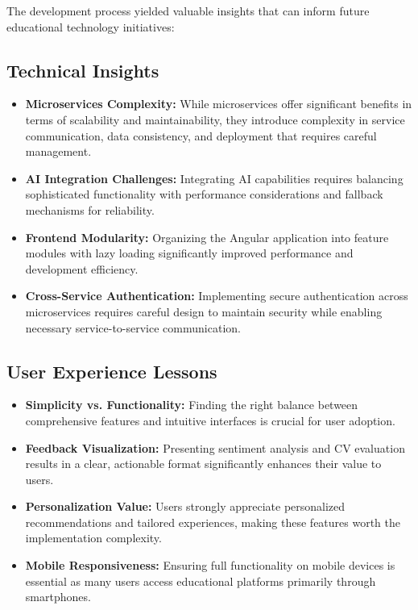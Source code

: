 \documentclass[12pt,a4paper]{report}
\begin{document}
The development process yielded valuable insights that can inform future educational technology initiatives:

\subsection{Technical Insights}

\begin{itemize}
    \item \textbf{Microservices Complexity:} While microservices offer significant benefits in terms of scalability and maintainability, they introduce complexity in service communication, data consistency, and deployment that requires careful management.

    \item \textbf{AI Integration Challenges:} Integrating AI capabilities requires balancing sophisticated functionality with performance considerations and fallback mechanisms for reliability.

    \item \textbf{Frontend Modularity:} Organizing the Angular application into feature modules with lazy loading significantly improved performance and development efficiency.

    \item \textbf{Cross-Service Authentication:} Implementing secure authentication across microservices requires careful design to maintain security while enabling necessary service-to-service communication.
\end{itemize}

\subsection{User Experience Lessons}

\begin{itemize}
    \item \textbf{Simplicity vs. Functionality:} Finding the right balance between comprehensive features and intuitive interfaces is crucial for user adoption.

    \item \textbf{Feedback Visualization:} Presenting sentiment analysis and CV evaluation results in a clear, actionable format significantly enhances their value to users.

    \item \textbf{Personalization Value:} Users strongly appreciate personalized recommendations and tailored experiences, making these features worth the implementation complexity.

    \item \textbf{Mobile Responsiveness:} Ensuring full functionality on mobile devices is essential as many users access educational platforms primarily through smartphones.
\end{itemize}
\end{document}
